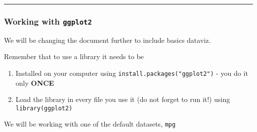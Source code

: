 \documentclass[
]{article}
\newenvironment{Shaded}{\begin{snugshade}}{\end{snugshade}}
\newcommand{\CommentTok}[1]{\textcolor[rgb]{0.56,0.35,0.01}{\textit{#1}}}
\newcommand{\KeywordTok}[1]{\textcolor[rgb]{0.13,0.29,0.53}{\textbf{#1}}}
\newcommand{\NormalTok}[1]{#1}
\begin{document}
\begin{center}\rule{0.5\linewidth}{0.5pt}\end{center}

\hypertarget{working-with-ggplot2}{%
\subsubsection{\texorpdfstring{Working with
\texttt{ggplot2}}{Working with ggplot2}}\label{working-with-ggplot2}}

We will be changing the document further to include basics dataviz.

Remember that to use a library it needs to be

\begin{enumerate}
\def\labelenumi{\arabic{enumi}.}
\item
  Installed on your computer using \texttt{install.packages("ggplot2")}
  - you do it only \textbf{ONCE}
\item
  Load the library in every file you use it (do not forget to run it!)
  using \texttt{library(ggplot2)}
\end{enumerate}

\begin{Shaded}
\end{Shaded}

We will be working with one of the default datasets, \texttt{mpg}
\end{document}
